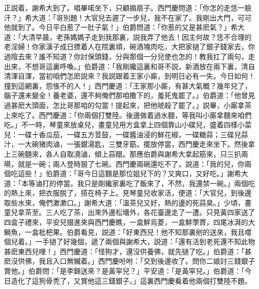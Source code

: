 正説着，謝希大到了。唱畢喏坐下，只顧搧扇子。西門慶問道：「你怎的走恁一臉汗？」希大道：「哥別題！大官兒去遲了一步兒，我不在家了。我剛出大門，可可他就到了。今日平白惹了一肚子氣！」伯爵問道：「你惹的又是甚麽氣？」希大道：「大清早晨，老孫媽媽子走到我那裏，説我弄了他去！因主何故？恁不合理的老淫婦！你家漢子成日摽着人在院裏頑，碗酒塊肉吃，大把家撾了銀子錢家去，你過陰去來？誰不知道？你討保頭錢，分與那個一分兒使也怎的！教我扛了兩句，走出來，不想哥這裏呼喚。」伯爵道：「我剛纔這裏和哥不説，新酒放在兩下裏，清自清渾自渾，當初咱們怎麽説來？我説跟着王家小廝，到明日必有一失。今日如何！撞到這網裏，怨悵不的人！」西門慶道：「王家那小廝，有甚大氣概？幾年兒了，腦子還未變全！養老婆，還不夠俺們那咱撒下的，羞死鬼罷了。」伯爵道：「他曾見過甚麽大頭面，怎比哥那咱的勾當！提起來，把他唬殺了罷了。」説畢，小廝拿茶上來吃了。西門慶道：「你兩個打雙陸。後邊做着過水麵，等我叫小廝拿麵來咱們吃。」不一時，琴童來放桌兒，畫童兒用方盒拿上四個靠山小碟兒，盛着四樣小菜兒：一碟十香瓜茄，一碟五方荳鼓，一碟醬油浸的鮮花椒，一碟糖蒜；三碟兒蒜汁，一大碗猪肉滷，一張銀湯匙，三雙牙筯。擺放停當，西門慶走來坐下。然後拿上三碗麵來，各人自取澆滷，傾上蒜醋。那應伯爵與謝希大拿起筋來，只三扒兩嚥，就是一碗；兩人登時狠了七碗。西門慶兩碗還吃不了，説道：「我的兒，你兩個吃這些！」伯爵道：「哥今日這麵是那位姐兒下的？又爽口，又好吃。」謝希大道：「本等滷打的停當。我只是剛纔家裏吃了飯來了，不然，我還禁一碗。」兩個吃的熱上來，把衣服脱了，搭在椅子上。見琴童兒收家活，便道：「大官兒，到後邊取些水來，俺們漱漱口。」謝希大道：「溫茶兒又好，熱的盪的死蒜臭。」少頃，畫童兒拿茶至。三人吃了茶，出來外邊松墻外，各花臺邊走了一遭。只見黃四家送了四盒子禮來，平安兒掇進來與西門慶瞧，一盒鮮烏菱，一盒鮮荸薺，四尾冰湃的大鰣魚，一盒枇杷果。伯爵看見，説道：「好東西兒！他不知那裏剜的送來，我且嚐個兒着。」一手撾了好幾個，遞了兩個與謝希大，説道：「還有活到老死還不知此物甚麽東西兒哩！」西門慶道：「怪狗才，還沒供養佛，就先撾了吃。」伯爵道：「甚麽沒供佛，我且入口無贓着。」西門慶吩咐：「交到後邊收了。問你二娘討三錢銀子賞他。」伯爵問：「是李錦送來？是黃寜兒？」平安道：「是黃寜兒。」伯爵道：「今日造化了這狗骨秃了，又賞他這三錢銀子。」這裏西門慶看着他兩個打雙陸不題。

